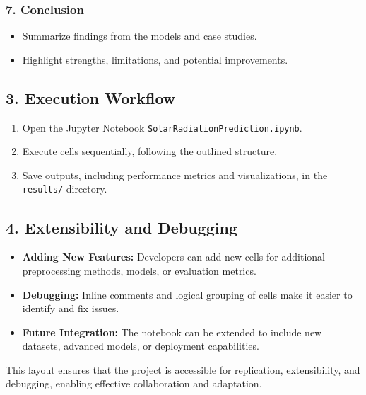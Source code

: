 \documentclass[10pt,twocolumn]{article}
\begin{document}
\subsubsection*{7. Conclusion}
\begin{itemize}
    \item Summarize findings from the models and case studies.
    \item Highlight strengths, limitations, and potential improvements.
\end{itemize}

\subsection*{3. Execution Workflow}
\begin{enumerate}
    \item Open the Jupyter Notebook \texttt{SolarRadiationPrediction.ipynb}.
    \item Execute cells sequentially, following the outlined structure.
    \item Save outputs, including performance metrics and visualizations, in the \texttt{results/} directory.
\end{enumerate}

\subsection*{4. Extensibility and Debugging}
\begin{itemize}
    \item \textbf{Adding New Features:} Developers can add new cells for additional preprocessing methods, models, or evaluation metrics.
    \item \textbf{Debugging:} Inline comments and logical grouping of cells make it easier to identify and fix issues.
    \item \textbf{Future Integration:} The notebook can be extended to include new datasets, advanced models, or deployment capabilities.
\end{itemize}

This layout ensures that the project is accessible for replication, extensibility, and debugging, enabling effective collaboration and adaptation.
\end{document}
